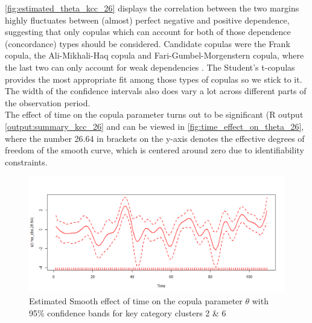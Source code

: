 \autoref{fig:estimated_theta_kcc_26} displays the correlation between the two margins highly fluctuates between (almost) perfect negative and positive dependence, suggesting that only copulas which can account for both of those dependence (concordance) types should be considered. Candidate copulas were the Frank copula, the Ali-Mikhali-Haq copula and Fari-Gumbel-Morgenstern copula, where the last two can only account for weak dependencies \citep{marra1605bivariate}. The Student's t-copulas provides the most appropriate fit among those types of copulas so we stick to it. The width of the confidence intervals also does vary a lot across different parts of the observation period.\\

The effect of time on the copula parameter turns out to be significant (R output \ref{output:summary_kcc_26} and can be viewed in \autoref{fig:time_effect_on_theta_26}, where the number 26.64 in brackets on the y-axis denotes the effective degrees of freedom of the smooth curve, which is centered around zero due to identifiability constraints.

\begin{figure}[H]
\centering
  \includegraphics[width=0.95\linewidth]{figures/time_effect_on_theta_26.png}
  \caption{Estimated Smooth effect of time on the copula parameter $\theta$ with 95\% confidence bands for key category clusters 2 \& 6}
  \label{fig:time_effect_on_theta_26}
\end{figure}



